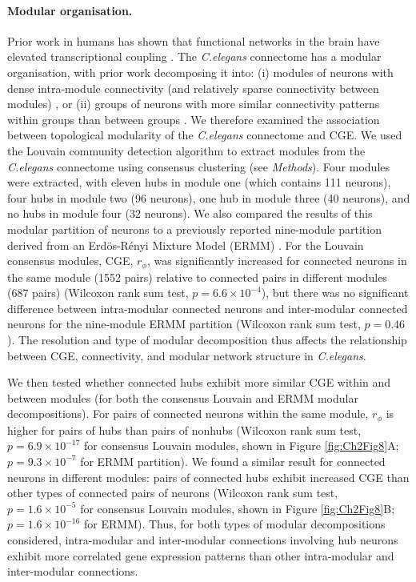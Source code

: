 {\paragraph{Modular organisation.}

Prior work in humans has shown that functional networks in the brain have elevated transcriptional coupling \citep{Richiardi2015}.
The \emph{C.elegans} connectome has a modular organisation, with prior work decomposing it into:
(i) modules of neurons with dense intra-module connectivity (and relatively sparse connectivity between modules) \citep{Kim2014a, Pan2010, Bassett2010}, or
(ii) groups of neurons with more similar connectivity patterns within groups than between groups \citep{Achacoso1992, Pavlovic2014}.
We therefore examined the association between topological modularity of the \emph{C.elegans} connectome and CGE.
We used the Louvain community detection algorithm \citep{Blondel2008} to extract modules from the \emph{C.elegans} connectome using consensus clustering (see \textit{Methods}).
Four modules were extracted, with eleven hubs in module one (which contains 111 neurons), four hubs in module two (96 neurons), one hub in module three (40 neurons), and no hubs in module four (32 neurons).
We also compared the results of this modular partition of neurons to a previously reported nine-module partition derived from an Erd\"os-R\'enyi Mixture Model (ERMM) \citep{Pavlovic2014}.
For the Louvain consensus modules, CGE, $r_\phi$, was significantly increased for connected neurons in the same module (1552 pairs) relative to connected pairs in different modules (687 pairs) (Wilcoxon rank sum test, $p = 6.6 \times 10^{-4}$), but there was no significant difference between intra-modular connected neurons and inter-modular connected neurons for the nine-module ERMM partition (Wilcoxon rank sum test, $p = 0.46$).
The resolution and type of modular decomposition thus affects the relationship between CGE, connectivity, and modular network structure in \emph{C.elegans}.

We then tested whether connected hubs exhibit more similar CGE within and between modules (for both the consensus Louvain and ERMM modular decompositions).
For pairs of connected neurons within the same module, $r_\phi$ is higher for pairs of hubs than pairs of nonhubs (Wilcoxon rank sum test, $p = 6.9\times 10^{-17}$ for consensus Louvain modules, shown in Figure \ref{fig:Ch2Fig8}A; $p = 9.3 \times 10^{-7}$ for ERMM partition).
We found a similar result for connected neurons in different modules: pairs of connected hubs exhibit increased CGE than other types of connected pairs of neurons (Wilcoxon rank sum test, $p = 1.6 \times 10^{-5}$ for consensus Louvain modules, shown in Figure \ref{fig:Ch2Fig8}B; $p = 1.6 \times 10^{-16}$ for ERMM).
Thus, for both types of modular decompositions considered, intra-modular and inter-modular connections involving hub neurons exhibit more correlated gene expression patterns than other intra-modular and inter-modular connections.

}
